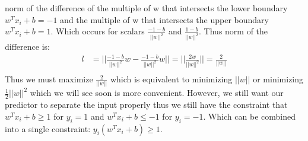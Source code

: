 \documentclass[12pt]{article}
\begin{document}
norm of the difference of the multiple of w that intersects the lower boundary $w^Tx_i + b = -1$ and the multiple
of w that intersects the upper boundary $w^Tx_i + b = 1$. Which occurs for scalars $\frac{-1 - b}{||w||^2}$ and $\frac{1 - b}{||w||^2}$.
Thus norm of the difference is:
\begin{align*}
    l &= ||\frac{-1 - b}{||w||^2}w - \frac{-1 - b}{||w||^2}w|| = ||\frac{2w}{||w||^2}|| = \frac{2}{||w||} \\
\end{align*}
Thus we must maximize $\frac{2}{||w||}$ which is equivalent to minimizing $||w||$ or 
minimizing $\frac{1}{2}||w||^2$ which we will see soon is more convenient. However,
we still want our predictor to separate the input properly thus we still have the constraint that 
$w^Tx_i + b \geq 1$ for $y_i = 1$ and $w^Tx_i + b \leq -1$ for $y_i = -1$. Which can be combined
into a single constraint: $y_i(w^Tx_i + b) \geq 1$.
\end{document}
